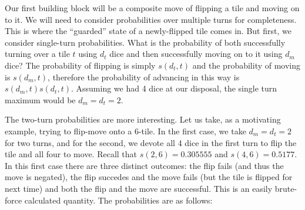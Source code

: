 \documentclass[letterpaper]{article}
\begin{document}
Our first building block will be a composite move of flipping a tile and
moving on to it.  We will need to consider probabilities over multiple turns
for completeness.  This is where the ``guarded'' state of a newly-flipped tile
comes in.  But first, we consider single-turn probabilities.  What is the
probability of both successfully turning over a tile $t$ using $d_t$ dice and
then successfully moving on to it using $d_m$ dice?  The probability of
flipping is simply $s(d_t,t)$ and the probability of moving is $s(d_m,t)$,
therefore the probability of advancing in this way is $s(d_m,t)s(d_t,t)$.
Assuming we had 4 dice at our disposal, the single turn maximum would be
$d_m=d_t=2$.  

The two-turn probabilities are more interesting.  Let us take,
as a motivating example, trying to flip-move onto a 6-tile.  In the first case,
we take $d_m=d_t=2$ for two turns, and for the second, we devote all 4 dice in
the first turn to flip the tile and all four to move.  Recall that $s(2,6) = 
0.305555$ and $s(4,6)=0.5177$.  In this first case there are three distinct
outcomes: the flip fails (and thus the move is negated), the flip succedes and
the move fails (but the tile is flipped for next time) and both the flip and
the move are successful.  This is an easily brute-force calculated quantity.
The probabilities are as follows:
\end{document}
